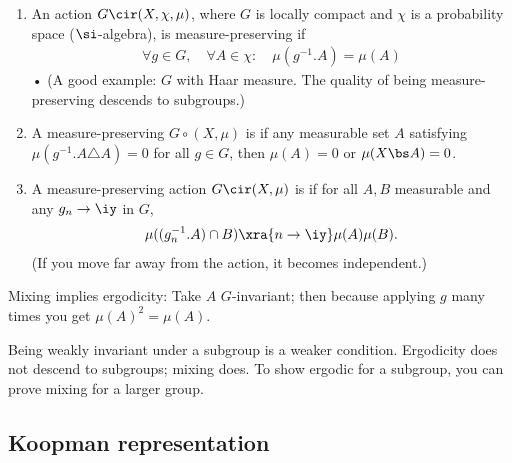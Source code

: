 \begin{df}
\begin{enumerate}
\item
An action $G\cir (X,\chi,\mu)$, where $G$ is locally compact and $\chi$ is a probability space ($\si$-algebra), is measure-preserving if %
\begin{align}
\forall g\in G, \quad \forall A\in \chi: \quad \mu(g^{-1}.A) = \mu(A)
\end{align}•
(A good example: $G$ with Haar measure. The quality of being measure-preserving descends to subgroups.)
\item
A measure-preserving $G\circ (X,\mu)$ is  if any measurable set $A$ satisfying $\mu(g^{-1}.A\triangle A)=0$ %
for all $g\in G$, then $\mu(A)=0$ or $\mu(X\bs A)=0$. 
\item
A measure-preserving action $G\cir (X,\mu)$ is  if for all $A,B$ measurable and any $g_n\to \iy$ in $G$, 
\begin{align}
\mu((g_n^{-1}.A)\cap B) \xra{n\to \iy} \mu(A)\mu(B).
\end{align}
(If you move far away from the action, it becomes independent.)
\end{enumerate}
\end{df}
Mixing implies ergodicity: 
Take $A$ $G$-invariant; then  because applying $g$ many times you get $\mu(A)^2=\mu(A)$. 

Being weakly invariant under a subgroup is a weaker condition. 
Ergodicity does not descend to subgroups; mixing does.
To show ergodic for a subgroup, you can prove mixing for a larger group. 
\subsection{Koopman representation}


